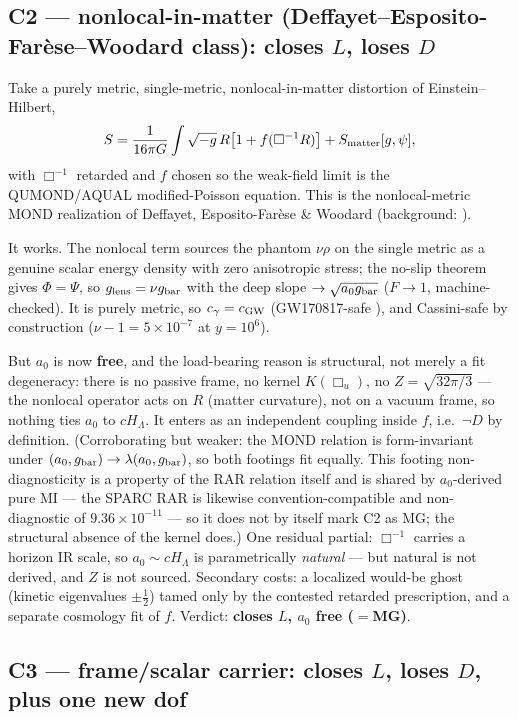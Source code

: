 \documentclass[11pt]{article}
\newcommand{\Boxu}{\Box_u}
\newcommand{\gbar}{g_{\rm bar}}
\newcommand{\glens}{g_{\rm lens}}
\newcommand{\cgw}{c_{\rm GW}}
\begin{document}
\subsection{C2 --- nonlocal-in-matter (Deffayet--Esposito-Far\`ese--Woodard class): closes $L$, loses $D$}\label{sec:c2}

Take a purely metric, single-metric, nonlocal-in-matter distortion of Einstein--Hilbert,
\begin{equation}
S=\frac{1}{16\pi G}\int\sqrt{-g}\,R\big[1+f(\Box^{-1}R)\big]+S_{\rm matter}[g,\psi],
\end{equation}
with $\Box^{-1}$ retarded and $f$ chosen so the weak-field limit is the QUMOND/AQUAL modified-Poisson equation. This is the nonlocal-metric MOND realization of Deffayet, Esposito-Far\`ese \& Woodard \cite{dew2011} (background: \cite{dw2009}).

It works. The nonlocal term sources the phantom $\nu\rho$ on the single metric as a genuine scalar energy density with zero anisotropic stress; the no-slip theorem gives $\Phi=\Psi$, so $\glens=\nu\gbar$ with the deep slope $\to\sqrt{a_0\gbar}$ ($F\to1$, machine-checked). It is purely metric, so $c_\gamma=\cgw$ (GW170817-safe \cite{abbott2017}), and Cassini-safe by construction ($\nu-1=5\times10^{-7}$ at $y=10^6$).

But $a_0$ is now \textbf{free}, and the load-bearing reason is structural, not merely a fit degeneracy: there is no passive frame, no kernel $K(\Boxu)$, no $Z=\sqrt{32\pi/3}$ --- the nonlocal operator acts on $R$ (matter curvature), not on a vacuum frame, so nothing ties $a_0$ to $cH_\Lambda$. It enters as an independent coupling inside $f$, i.e.\ $\lnot D$ by definition. (Corroborating but weaker: the MOND relation is form-invariant under $(a_0,\gbar)\to\lambda(a_0,\gbar)$, so both footings fit equally. This footing non-diagnosticity is a property of the RAR relation itself and is shared by $a_0$-derived pure MI --- the SPARC RAR is likewise convention-compatible and non-diagnostic of $9.36\times10^{-11}$ --- so it does not by itself mark C2 as MG; the structural absence of the kernel does.) One residual partial: $\Box^{-1}$ carries a horizon IR scale, so $a_0\sim cH_\Lambda$ is parametrically \emph{natural} --- but natural is not derived, and $Z$ is not sourced. Secondary costs: a localized would-be ghost (kinetic eigenvalues $\pm\tfrac12$) tamed only by the contested retarded prescription, and a separate cosmology fit of $f$. Verdict: \textbf{closes $L$, $a_0$ free ($=$MG)}.

\subsection{C3 --- frame/scalar carrier: closes $L$, loses $D$, plus one new dof}\label{sec:c3}
\end{document}
